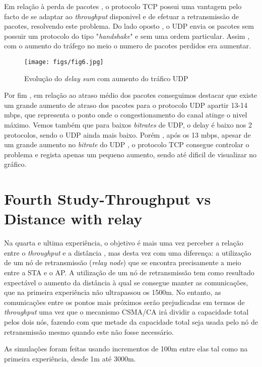 Em relação à perda de pacotes , o protocolo TCP possui uma vantagem pelo facto de se adaptar ao \textit{throughput} disponivel
e de efetuar a retransmissão de pacotes, resolvendo este problema. Do lado oposto , o  UDP envia os pacotes sem possuir um
protocolo do tipo "\textit{handshake}" e sem uma ordem particular. Assim , com o aumento do tráfego no meio o numero de pacotes
perdidos era aumentar.


\begin{figure}[H]
    \centering
    \texttt{[image: figs/fig6.jpg]}
    \caption{Evolução do \textit{delay sum} com aumento do tráfico UDP}
    \label{fig:5}
\end{figure}

Por fim , em relação ao atraso médio dos pacotes conseguimos destacar que existe um grande aumento de atraso dos pacotes para o protocolo
UDP apartir 13-14 mbps, que representa o ponto onde o congestionamento do canal atinge o nivel máximo. Vemos também que
para baixos \textit{bitrates} de UDP, o delay é baixo nos 2 protocolos, sendo o UDP ainda mais baixo. Porém , após os 13 mbps, apesar de um 
grande aumento no \textit{bitrate} do UDP , o protocolo TCP consegue controlar o problema e regista apenas um pequeno aumento, sendo até dificil de visualizar
no gráfico.


\section{Fourth Study-Throughput vs Distance with relay} \label{ex4}
    Na quarta e ultima experiência, o objetivo é mais uma vez perceber a relação entre o \textit{throughput} e a distância , mas desta vez com uma diferença:
    a utilização de um nó de retransmissão (\textit{relay node}) que se encontra precisamente a meio entre a STA e o AP.
    A utilização de um nó de retransmissão tem como resultado expectável o aumento da distância à qual se consegue manter as comunicações, que na primeira experiência não ultrapassou
    os 1500m. No entanto, as comunicações entre os pontos mais próximos serão prejudicadas em termos de \textit{throughput} uma vez que o mecanismo CSMA/CA irá dividir a capacidade total 
    pelos dois nós, fazendo com que metade da capacidade total seja usada pelo nó de retransmissão mesmo quando este não fosse
    necessário.

    As simulações foram feitas usando incrementos de 100m entre elas tal como na primeira experiência, desde 1m até 3000m.



